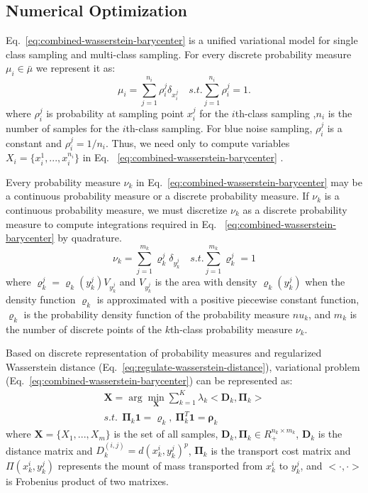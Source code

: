 \subsection{Numerical Optimization}
Eq.~\ref{eq:combined-wasserstein-barycenter} is a unified variational model for single class sampling and multi-class sampling.
For every discrete probability measure $\mu_i\in\bar\mu$
we represent it as:
\begin{equation}
 \mu_i=\sum\limits_{j=1}^{n_i}\rho_i^j\delta_{x_i^j} \quad s.t. \sum\limits_{j=1}^{n_i}\rho_i^j=1.
\end{equation}
where $\rho_i^j$ is probability at sampling point $x_i^j$ for the $i$th-class sampling
,$n_i$ is the number of samples for the $i$th-class sampling.
For blue noise sampling,
$\rho_i^j$ is a constant and $\rho_i^j=1/n_i$.
Thus, we need only to compute variables $X_i=\{x_i^1,...,x_i^{n_i}\}$ in Eq. ~\ref{eq:combined-wasserstein-barycenter} .

Every probability measure $\nu_k$ in Eq.~\ref{eq:combined-wasserstein-barycenter} may be a continuous probability measure or a discrete probability measure.
If $\nu_k$ is a continuous probability measure,
we must discretize  $\nu_k$ as a discrete probability measure
to compute integrations required in Eq. ~\ref{eq:combined-wasserstein-barycenter} by quadrature.
\begin{equation}
\nu_k=\sum\limits_{j=1}^{m_k}\varrho_k^j\delta_{y_k^j} \quad s.t. \sum\limits_{j=1}^{m_k}\varrho_k^j=1
\end{equation}
where $\varrho_k^j=\varrho_k(y_k^j)V_{y_k^j}$
and $V_{y_k^j}$ is the area with density $\varrho_k(y_k^j)$ when the density function
$\varrho_k$ is approximated with a positive piecewise constant function,
$\varrho_k$ is the probability density function of the probability measure $nu_k$,
and $m_k$ is the number of discrete points of the $k$th-class probability measure $\nu_k$.

Based on discrete representation of probability measures and regularized Wasserstein distance (Eq.~\ref{eq:regulate-wasserstein-distance}),
variational problem (Eq.~\ref{eq:combined-wasserstein-barycenter}) can be represented as:
\begin{equation}\label{eq:discrete-multi-problem}
  \begin{aligned}
  \mathbf{X}=\arg\min\limits_{\mathbf{X}}\sum\limits_{k=1}^K\lambda_k<\mathbf{D}_k,\mathbf{\Pi}_k> \\
    s.t.\ \ \mathbf{\Pi}_k\mathbf{1}=\mathbf{\varrho}_k,\ \mathbf{\Pi}_k^T\mathbf{1}=\mathbf{\rho}_k
  \end{aligned}
\end{equation}
where $\mathbf{X}=\{X_1,...,X_m\}$ is the set of all samples,
 $\mathbf{D}_k,\mathbf{\Pi}_k\in R_+^{n_k\times m_k}$,
 $\mathbf{D}_k$ is the distance matrix and $D_k^{(i,j)}=d(x_k^i,y_k^j)^p$,
 $\mathbf{\Pi}_k$ is the transport cost matrix and $\Pi(x_k^i,y_k^j)$ represents the mount of mass transported from $x_k^i$ to $y_k^j$,
 and $<\cdot,\cdot>$ is Frobenius product of two matrixes.

